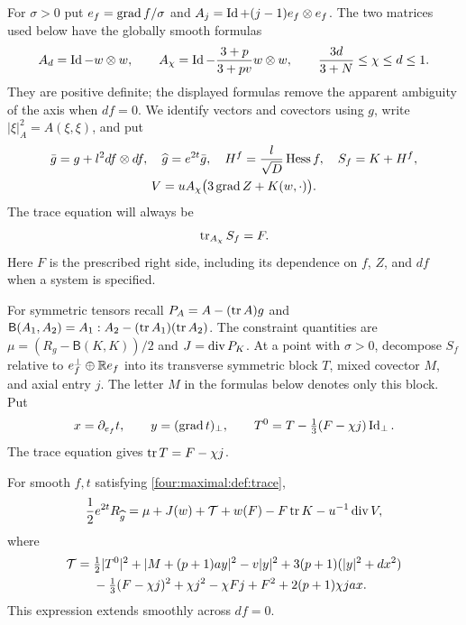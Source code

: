 For $\sigma>0$ put $e_f=\operatorname{grad} f/\sigma$ and
$A_j=\operatorname{Id}+(j-1)e_f\otimes e_f$.  The two matrices used below have the
globally smooth formulas
\begin{equation}\label{four:maximal:def:matrices}
 A_d=\operatorname{Id}-w\otimes w,\qquad
 A_\chi=\operatorname{Id}-\frac{3+p}{3+pv}w\otimes w,
 \qquad \frac{3d}{3+N}\le\chi\le d\le1.
\end{equation}
They are positive definite; the displayed formulas remove the apparent
ambiguity of the axis when $df=0$.  We identify vectors and covectors
using $g$, write $|\xi|_A^2=A(\xi,\xi)$, and put
\begin{equation}\label{four:maximal:def:graph-fields}
 \begin{gathered}
 \bar g=g+l^2df\otimes df,\quad
 \widehat g=e^{2t}\bar g,\quad
 H^f=\frac{l}{\sqrt D}\operatorname{Hess} f,\quad S_f=K+H^f,\\
 V=uA_\chi\bigl(3\operatorname{grad} Z+K(w,\cdot)\bigr).
 \end{gathered}
\end{equation}
The trace equation will always be
\begin{equation}\label{four:maximal:def:trace}
 \operatorname{tr}_{A_\chi}S_f=F.
\end{equation}
Here $F$ is the prescribed right side, including its dependence on $f$,
$Z$, and $df$ when a system is specified.

For symmetric tensors recall
$P_A=A-(\operatorname{tr} A)g$ and
$\mathsf{B}(A_1,A_2)=A_1:A_2-(\operatorname{tr} A_1)(\operatorname{tr} A_2)$.
The constraint quantities are
$\mu=(R_g-\mathsf{B}(K,K))/2$ and $J=\operatorname{div} P_K$.
At a point with $\sigma>0$, decompose $S_f$ relative to
$e_f^\perp\oplus\mathbb R e_f$ into its transverse symmetric block $T$, mixed
covector $M$, and axial entry $j$.  The letter $M$ in the formulas below
denotes only this block.  Put
\begin{equation}\label{four:maximal:def:blocks}
 x=\partial_{e_f}t,\qquad y=(\operatorname{grad} t)_\perp,
 \qquad T^0=T-\tfrac13(F-\chi j)\operatorname{Id}_\perp.
\end{equation}
The trace equation gives $\operatorname{tr} T=F-\chi j$.

\begin{proposition}\label{four:maximal:prop:scalar-identity}
For smooth $f,t$ satisfying \eqref{four:maximal:def:trace},
\begin{equation}\label{four:maximal:def:scalar-identity}
 \frac12 e^{2t}R_{\widehat g}
 =\mu+J(w)+\mathcal T+w(F)-F\operatorname{tr} K-u^{-1}\operatorname{div} V,
\end{equation}
where
\begin{align}\label{four:maximal:def:quadratic-form}
 \mathcal T={}&\tfrac12|T^0|^2+|M+(p+1)ay|^2-v|y|^2
       +3(p+1)(|y|^2+dx^2)\notag\\
 &-\tfrac13(F-\chi j)^2+\chi j^2-\chi Fj+F^2
       +2(p+1)\chi jax.
\end{align}
This expression extends smoothly across $df=0$.
\end{proposition}

